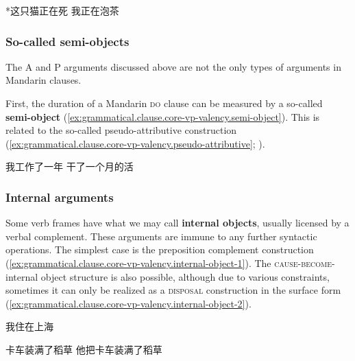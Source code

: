 \documentclass[UTF8, a4paper, oneside, scheme=plain, 12pt]{ctexrep}
\newcommand*{\concept}[1]{\textbf{#1}}
\newcommand*{\category}[1]{\textsc{#1}}
\begin{document}
\begin{exe}
    \ex\label{ex:grammatical.clause.core-vp.valency.progressive.1} *这只猫正在死
    \ex\label{ex:grammatical.clause.core-vp.valency.progressive.2} 我正在泡茶
\end{exe}

\subsubsection{So-called semi-objects}

The A and P arguments discussed above are not the only types of arguments in Mandarin clauses.

First, the duration of a Mandarin \category{do} clause
can be measured by a so-called \concept{semi-object}
(\ref{ex:grammatical.clause.core-vp-valency.semi-object}).
This is related to the so-called pseudo-attributive construction
(\ref{ex:grammatical.clause.core-vp-valency.pseudo-attributive};
).

\begin{exe}
    \ex\label{ex:grammatical.clause.core-vp-valency.semi-object} 我工作了一年
    \ex\label{ex:grammatical.clause.core-vp-valency.pseudo-attributive} 干了一个月的活
\end{exe}

\subsubsection{Internal arguments}\label{sec:grammatical.clause.core-vp.internal}

Some verb frames have what we may call \concept{internal objects}, usually licensed by a verbal complement.
These arguments are immune to any further syntactic operations.
The simplest case is the preposition complement construction (\ref{ex:grammatical.clause.core-vp-valency.internal-object-1}).
The \category{cause}-\category{become}-internal object structure is also possible,
although due to various constraints, sometimes it can only be realized as a \category{disposal} construction in the surface form (\ref{ex:grammatical.clause.core-vp-valency.internal-object-2}).


\begin{exe}
    \ex\label{ex:grammatical.clause.core-vp-valency.internal-object-1}
    我住在上海
    \ex\label{ex:grammatical.clause.core-vp-valency.internal-object-2} 
    \begin{xlist}
        \ex 卡车装满了稻草
        \ex 他把卡车装满了稻草
    \end{xlist}
\end{exe}
\end{document}
